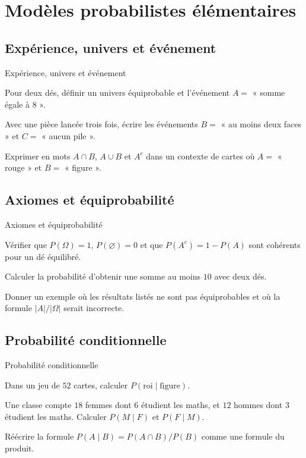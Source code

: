 \chapter{Modèles probabilistes élémentaires}
\label{workbook:chapter:08}
\section{Expérience, univers et événement}
\label{workbook:section:08.01}
\begin{exerciseblock}{Expérience, univers et événement}
\item Pour deux dés, définir un univers équiprobable et l'événement $A=$ « somme égale à $8$ ».
\item Avec une pièce lancée trois fois, écrire les événements $B=$ « au moins deux faces » et $C=$ « aucun pile ».
\item Exprimer en mots $A\cap B$, $A\cup B$ et $A^c$ dans un contexte de cartes où $A=$ « rouge » et $B=$ « figure ».
\end{exerciseblock}
\section{Axiomes et équiprobabilité}
\label{workbook:section:08.02}
\begin{exerciseblock}{Axiomes et équiprobabilité}
\item Vérifier que $P(\Omega)=1$, $P(\varnothing)=0$ et que $P(A^c)=1-P(A)$ sont cohérents pour un dé équilibré.
\item Calculer la probabilité d'obtenir une somme au moins $10$ avec deux dés.
\item Donner un exemple où les résultats listés ne sont pas équiprobables et où la formule $|A|/|\Omega|$ serait incorrecte.
\end{exerciseblock}
\section{Probabilité conditionnelle}
\label{workbook:section:08.03}
\begin{exerciseblock}{Probabilité conditionnelle}
\item Dans un jeu de $52$ cartes, calculer $P(\text{roi}\mid\text{figure})$.
\item Une classe compte $18$ femmes dont $6$ étudient les maths, et $12$ hommes dont $3$ étudient les maths. Calculer $P(M\mid F)$ et $P(F\mid M)$.
\item Réécrire la formule $P(A\mid B)=P(A\cap B)/P(B)$ comme une formule du produit.
\end{exerciseblock}
